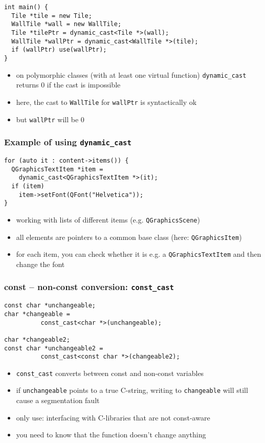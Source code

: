 \documentclass{slides}
\begin{document}
\begin{frame}[fragile]
\begin{onlyenv}
\begin{lstlisting}[emph={dynamic_cast,makeMePolymorph}]
int main() {
  Tile *tile = new Tile;
  WallTile *wall = new WallTile;
  Tile *tilePtr = dynamic_cast<Tile *>(wall);
  WallTile *wallPtr = dynamic_cast<WallTile *>(tile);
  if (wallPtr) use(wallPtr);
}
\end{lstlisting}
    \begin{itemize}
    \item on polymorphic classes (with at least one virtual function)
      \lstinline!dynamic_cast! returns 0 if the cast is impossible
    \item here, the cast to \lstinline!WallTile! for
      \lstinline!wallPtr! is syntactically ok
    \item but \lstinline!wallPtr! will be 0
    \end{itemize}
  \end{onlyenv}

\end{frame}

\begin{frame}[fragile]
  \frametitle{Example of using \lstinline!dynamic_cast!}
\begin{lstlisting}
for (auto it : content->items()) {
  QGraphicsTextItem *item =
    dynamic_cast<QGraphicsTextItem *>(it);
  if (item)
    item->setFont(QFont("Helvetica"));
}
\end{lstlisting}

  \begin{itemize}
  \item working with lists of different items (e.g. \lstinline!QGraphicsScene!)
  \item all elements are pointers to a common base class (here:
    \lstinline!QGraphicsItem!)
  \item for each item, you can check whether it is e.g. a
    \lstinline!QGraphicsTextItem! and then change the font
  \end{itemize}  
\end{frame}

\begin{frame}[fragile]
  \frametitle{const -- non-const conversion: \lstinline!const_cast!}

\begin{lstlisting}
const char *unchangeable;
char *changeable =
          const_cast<char *>(unchangeable);

char *changeable2;
const char *unchangeable2 =
          const_cast<const char *>(changeable2);
\end{lstlisting}

  \begin{itemize}
  \item \lstinline!const_cast! converts between const and non-const variables
  \item if \lstinline!unchangeable! points to a true C-string, writing
    to \lstinline!changeable! will still cause a segmentation fault
  \item only use: interfacing with C-libraries that are not const-aware
  \item you need to know that the function doesn't change anything
  \end{itemize}
\end{frame}
\end{document}

